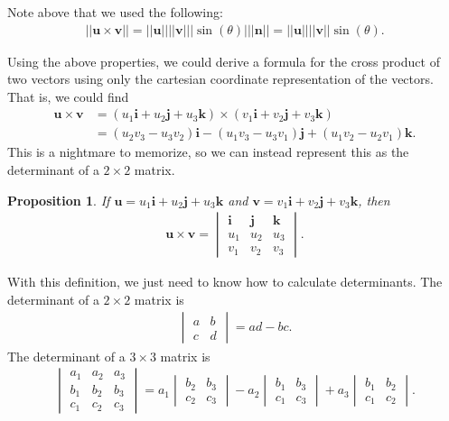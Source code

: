 \documentclass[12pt, letter]{article}
\theoremstyle{plain}
\newtheorem{proposition}[theorem]{Proposition}
\numberwithin{theorem}{section}
\theoremstyle{definition}
\begin{document}
\bigskip

Note above that we used the following:
\begin{align*}
||\bm{u}\times\bm{v}|| = ||\bm{u}|| ||\bm{v}|| |\sin(\theta)| ||\bm{n}|| = ||\bm{u}|| ||\bm{v}|| \sin(\theta).
\end{align*}

\bigskip

\hrulefill

\bigskip

Using the above properties, we could derive a formula for the cross product of two vectors using only the cartesian coordinate representation of the vectors. That is, we could find
\begin{align*}
\bm{u} \times \bm{v} &= (u_1 \bm{i} + u_2 \bm{j} + u_3 \bm{k}) \times (v_1 \bm{i} + v_2 \bm{j} + v_3 \bm{k})\\
&= (u_2v_3-u_3v_2)\bm{i} - (u_1v_3-u_3v_1)\bm{j}+(u_1v_2-u_2v_1)\bm{k}.
\end{align*}
This is a nightmare to memorize, so we can instead represent this as the determinant of a $2 \times 2$ matrix.

\bigskip

\begin{proposition}
If $\bm{u} = u_1\bm{i} + u_2\bm{j} + u_3\bm{k}$ and $\bm{v} = v_1\bm{i} + v_2\bm{j} + v_3\bm{k}$, then
\begin{align*}
\bm{u} \times \bm{v} = \begin{vmatrix} \bm{i} & \bm{j} & \bm{k} \\ u_1 & u_2 & u_3 \\ v_1 & v_2 & v_3 \end{vmatrix}.
\end{align*}
\end{proposition}

\bigskip

\hrulefill

\bigskip

With this definition, we just need to know how to calculate determinants. The determinant of a $2\times 2$ matrix is
\begin{align*}
\begin{vmatrix} a & b \\ c & d \end{vmatrix} = ad-bc.
\end{align*}
The determinant of a $3\times 3$ matrix is
\begin{align*}
\begin{vmatrix} a_1 & a_2 & a_3 \\ b_1 & b_2 & b_3 \\ c_1 & c_2 & c_3 \end{vmatrix} = a_1 \begin{vmatrix} b_2 & b_3 \\ c_2 & c_3 \end{vmatrix} - a_2 \begin{vmatrix} b_1 & b_3 \\ c_1 & c_3 \end{vmatrix} + a_3 \begin{vmatrix} b_1 & b_2 \\ c_1 & c_2 \end{vmatrix}.
\end{align*}
\end{document}
